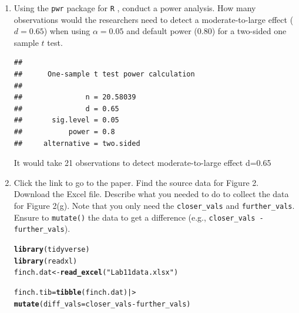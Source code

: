 \documentclass{article}\usepackage[]{graphicx}\usepackage[]{xcolor}
\makeatletter
\newcommand{\hlsng}[1]{\textcolor[rgb]{0.192,0.494,0.8}{#1}}%
\newcommand{\hlopt}[1]{\textcolor[rgb]{0,0,0}{#1}}%
\newcommand{\hldef}[1]{\textcolor[rgb]{0.345,0.345,0.345}{#1}}%
\newcommand{\hlkwb}[1]{\textcolor[rgb]{0.69,0.353,0.396}{#1}}%
\newcommand{\hlkwc}[1]{\textcolor[rgb]{0.333,0.667,0.333}{#1}}%
\newcommand{\hlkwd}[1]{\textcolor[rgb]{0.737,0.353,0.396}{\textbf{#1}}}%
\newenvironment{kframe}{%
 \def\at@end@of@kframe{}%
 \ifinner\ifhmode%
  \def\at@end@of@kframe{\end{minipage}}%
  \begin{minipage}{\columnwidth}%
 \fi\fi%
 \def\FrameCommand##1{\hskip\@totalleftmargin \hskip-\fboxsep
 \colorbox{shadecolor}{##1}\hskip-\fboxsep
     \hskip-\linewidth \hskip-\@totalleftmargin \hskip\columnwidth}%
 \MakeFramed {\advance\hsize-\width
   \@totalleftmargin\z@ \linewidth\hsize
   \@setminipage}}%
 {\par\unskip\endMakeFramed%
 \at@end@of@kframe}
\newenvironment{knitrout}{}{} %
\makeatother
\begin{document}
\begin{enumerate}
\item Using the \texttt{pwr} package for \texttt{R} \citep{pwr},
conduct a power analysis. How many observations would the researchers 
need to detect a moderate-to-large effect ($d=0.65$) when using 
$\alpha=0.05$ and default power (0.80) for a two-sided one sample 
$t$ test.

\begin{knitrout}
\color{fgcolor}\begin{kframe}
\begin{verbatim}
## 
##      One-sample t test power calculation 
## 
##               n = 20.58039
##               d = 0.65
##       sig.level = 0.05
##           power = 0.8
##     alternative = two.sided
\end{verbatim}
\end{kframe}
\end{knitrout}

It would take 21 observations to detect moderate-to-large effect d=0.65
\item Click the link to go to the paper. Find the source data for 
Figure 2. Download the Excel file. Describe what you needed to
do to collect the data for Figure 2(g). Note that you only need the 
\texttt{closer\_vals} and \texttt{further\_vals}. Ensure to 
\texttt{mutate()} the data to get a difference 
(e.g., \texttt{closer\_vals - further\_vals}).

\begin{knitrout}
\color{fgcolor}\begin{kframe}
\begin{alltt}
\hlkwd{library}\hldef{(tidyverse)}
\hlkwd{library}\hldef{(readxl)}
\hldef{finch.dat} \hlkwb{<-} \hlkwd{read_excel}\hldef{(}\hlsng{"Lab11data.xlsx"}\hldef{)}

\hldef{finch.tib} \hlkwb{=} \hlkwd{tibble}\hldef{(finch.dat) |>}
  \hlkwd{mutate}\hldef{(}\hlkwc{diff_vals}\hldef{=closer_vals} \hlopt{-} \hldef{further_vals)}
\end{alltt}
\end{kframe}
\end{knitrout}


\end{enumerate}
\end{document}
